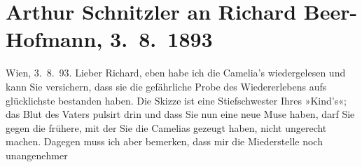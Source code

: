 

         
         \renewcommand{\erwaehntePersonen}{Personen: Richard Beer-Hofmann, Otto Erich Hartleben, Felix Salten}
         \renewcommand{\erwaehnteOrte}{Orte: Bad Ischl, Schulgasse, Wien}
         \renewcommand{\erwaehnteWerke}{Werke: Camelias, Das Kind, Der Tod Georgs, Die Erziehung zur Ehe, Die kleine Komödie, Novellen}
               \section[Arthur Schnitzler an Richard Beer-Hofmann, 3. 8. 1893]{ Arthur Schnitzler an Richard Beer-Hofmann, 3. 8. 1893}\nopagebreak{}\rehead{ }\begin{ledgroupsized}[t]{13cm}\normalsize\beginnumbering \toendnotes[C]{\smallbreak\pagebreak[2]} 
\toendnotes[C]{\smallbreak}\pstart
           \raggedleft{}{\pb}Wien, 3. 8. 93.\pend
           \pstart
           Lieber Richard, eben habe ich die Camelia’s wiedergelesen und kann Sie versichern, dass sie die gefährliche
               Probe des Wiedererlebens aufs glücklichste bestanden haben. Die Skizze ist eine
               Stiefschwester Ihres »Kind’s«; das Blut des Vaters
               pulsirt drin und dass Sie nun eine neue Muse haben, darf Sie gegen die frühere, mit
               der Sie die Camelias gezeugt haben, nicht ungerecht
               machen. Dagegen muss ich aber bemerken, dass mir die Miederstelle noch unangenehmer

\end{ledgroupsized}
